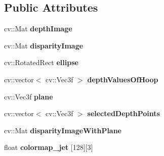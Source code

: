 \subsection*{Public Attributes}
\begin{DoxyCompactItemize}
\item 
\hypertarget{classHoopPosition_a0e936b9d6c792b73dbce44352be59756}{
cv::Mat {\bfseries depthImage}}
\label{classHoopPosition_a0e936b9d6c792b73dbce44352be59756}

\item 
\hypertarget{classHoopPosition_a667a7bce18b5eea72c46b50e4d5a9e5c}{
cv::Mat {\bfseries disparityImage}}
\label{classHoopPosition_a667a7bce18b5eea72c46b50e4d5a9e5c}

\item 
\hypertarget{classHoopPosition_ac1928a1d7ef1a80dd8f9325f7e1ad941}{
cv::RotatedRect {\bfseries ellipse}}
\label{classHoopPosition_ac1928a1d7ef1a80dd8f9325f7e1ad941}

\item 
\hypertarget{classHoopPosition_a5ab8e737eb6047f73d391483c68a076c}{
cv::vector$<$ cv::Vec3f $>$ {\bfseries depthValuesOfHoop}}
\label{classHoopPosition_a5ab8e737eb6047f73d391483c68a076c}

\item 
\hypertarget{classHoopPosition_adad7cb5d3961670620eebe4d190bf062}{
cv::Vec3f {\bfseries plane}}
\label{classHoopPosition_adad7cb5d3961670620eebe4d190bf062}

\item 
\hypertarget{classHoopPosition_aac3dd07ab3c719fcd1ac4630907a7d03}{
cv::vector$<$ cv::Vec3f $>$ {\bfseries selectedDepthPoints}}
\label{classHoopPosition_aac3dd07ab3c719fcd1ac4630907a7d03}

\item 
\hypertarget{classHoopPosition_a9f4fde272e414b0afb69a142956117e1}{
cv::Mat {\bfseries disparityImageWithPlane}}
\label{classHoopPosition_a9f4fde272e414b0afb69a142956117e1}

\item 
\hypertarget{classHoopPosition_ad8233e83f2b2254b824671519cea063a}{
float {\bfseries colormap\_\-jet} \mbox{[}128\mbox{]}\mbox{[}3\mbox{]}}
\label{classHoopPosition_ad8233e83f2b2254b824671519cea063a}

\end{DoxyCompactItemize}


